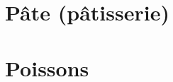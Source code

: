 \documentclass[twosides, 11pt]{book}
\begin{document}
\maketitle
\tableofcontents
\chapter{Pâte (pâtisserie)}

\chapter{Poissons}





\clearpage
\printindex
\end{document}
